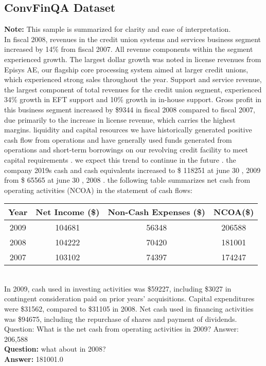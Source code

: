 \documentclass[logo,msc]{infthesis}           %
\begin{document}
\subsection{ConvFinQA Dataset}
\begin{tcolorbox}[
    colback=blue!5!white, %
    colframe=gray, %
    fonttitle=\bfseries, %
    breakable, %
    sharp corners, %
    boxsep=10pt, %
    left=10pt, %
    right=10pt, %
    top=10pt, %
    bottom=10pt %
]
\textbf{Note:} This sample is summarized for clarity and ease of interpretation.\\
In fiscal 2008, revenues in the credit union systems and services business segment increased by 14\% from fiscal 2007. All revenue components within the segment experienced growth. The largest dollar growth was noted in license revenues from Episys AE, our flagship core processing system aimed at larger credit unions, which experienced strong sales throughout the year. Support and service revenue, the largest component of total revenues for the credit union segment, experienced 34\% growth in EFT support and 10\% growth in in-house support. Gross profit in this business segment increased by \$9344 in fiscal 2008 compared to fiscal 2007, due primarily to the increase in license revenue, which carries the highest margins.
liquidity and capital resources we have historically generated positive cash flow from operations and have generally used funds generated from operations and short-term borrowings on our revolving credit facility to meet capital requirements . we expect this trend to continue in the future . the company 2019s cash and cash equivalents increased to \$ 118251 at june 30 , 2009 from \$ 65565 at june 30 , 2008 . the following table summarizes net cash from operating activities (NCOA) in the statement of cash flows: \\
\begin{tabular}{cccc}
\toprule
\textbf{Year} & \textbf{Net Income (\$)} & \textbf{Non-Cash Expenses (\$)} & \textbf{NCOA(\$)} \\
\midrule
2009 & 104681 & 56348 & 206588 \\
2008 & 104222 & 70420 & 181001 \\
2007 & 103102 & 74397 & 174247 \\
\bottomrule
\end{tabular} \\
In 2009, cash used in investing activities was \$59227, including \$3027 in contingent consideration paid on prior years' acquisitions. Capital expenditures were \$31562, compared to \$31105 in 2008. Net cash used in financing activities was \$94675, including the repurchase of shares and payment of dividends. Question: What is the net cash from operating activities in 2009? Answer: 206,588 \\
\textbf{Question:} what about in 2008? \\
\textbf{Answer:} 181001.0
\end{tcolorbox}
\end{document}
